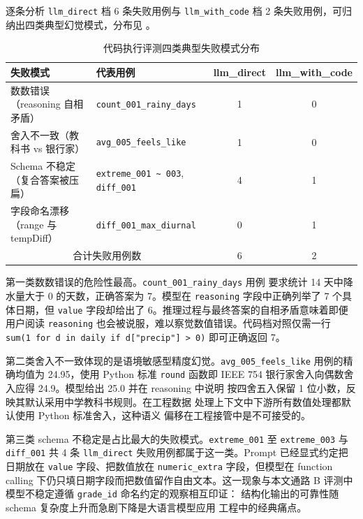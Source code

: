 逐条分析 \texttt{llm\_\bk{}direct} 档 6 条失败用例与 \texttt{llm\_\bk{}with\_\bk{}code}
档 2 条失败用例，可归纳出四类典型幻觉模式，分布见
。

\begin{table}[H]
    \centering
    \caption{代码执行评测四类典型失败模式分布}
    \label{tab:code-fail-modes}
    \song\fontsize{9pt}{12pt}\selectfont
    \renewcommand{\arraystretch}{0.95}
    \begin{tabular}{llcc}
        \toprule
        失败模式 & 代表用例 & llm\_direct & llm\_with\_code \\
        \midrule
        数数错误（reasoning 自相矛盾） & \texttt{count\_\bk{}001\_\bk{}rainy\_\bk{}days} & 1 & 0 \\
        舍入不一致（教科书 vs 银行家） & \texttt{avg\_\bk{}005\_\bk{}feels\_\bk{}like} & 1 & 0 \\
        Schema 不稳定（复合答案被压扁） & \texttt{extreme\_001 \textasciitilde{} 003}, \texttt{diff\_\bk{}001} & 4 & 1 \\
        字段命名漂移（range 与 tempDiff） & \texttt{diff\_\bk{}001\_\bk{}max\_\bk{}diurnal} & 0 & 1 \\
        \midrule
        \multicolumn{2}{c}{合计失败用例数} & 6 & 2 \\
        \bottomrule
    \end{tabular}
\end{table}

第一类数数错误的危险性最高。\texttt{count\_\bk{}001\_\bk{}rainy\_\bk{}days} 用例
要求统计 14 天中降水量大于 0 的天数，正确答案为 7。模型在
\texttt{reasoning} 字段中正确列举了 7 个具体日期，但 \texttt{value}
字段却给出了 6。推理过程与最终答案的自相矛盾意味着即便用户阅读
\texttt{reasoning} 也会被说服，难以察觉数值错误。代码档对照仅需一行
\texttt{sum(1 for d in daily if d["precip"] > 0)} 即可正确返回 7。

第二类舍入不一致体现的是语境敏感型精度幻觉。\texttt{avg\_\bk{}005\_\bk{}feels\_\bk{}like}
用例的精确均值为 24.95，使用 Python 标准 \texttt{round} 函数即 IEEE 754
银行家舍入向偶数舍入应得 24.9。模型给出 25.0 并在 reasoning 中说明
按四舍五入保留 1 位小数，反映其默认采用中学教科书规则。在工程数据
处理上下文中下游所有数值处理都默认使用 Python 标准舍入，这种语义
偏移在工程接管中是不可接受的。

第三类 schema 不稳定是占比最大的失败模式。\texttt{extreme\_\bk{}001} 至
\texttt{extreme\_\bk{}003} 与 \texttt{diff\_\bk{}001} 共 4 条 \texttt{llm\_\bk{}direct}
失败用例都属于这一类。Prompt 已经显式约定把日期放在 \texttt{value}
字段、把数值放在 \texttt{numeric\_\bk{}extra} 字段，但模型在 function
calling 下仍只填日期字段而把数值留作自由文本。这一现象与本文通路 B
评测中模型不稳定遵循 \texttt{grade\_\bk{}id} 命名约定的观察相互印证：
结构化输出的可靠性随 schema 复杂度上升而急剧下降是大语言模型应用
工程中的经典痛点。

